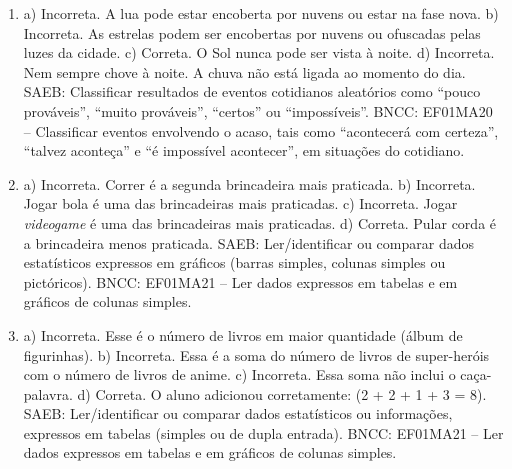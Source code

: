 \begin{enumerate}
\item
a) Incorreta. A lua pode estar encoberta por nuvens ou estar na fase nova.
b) Incorreta. As estrelas podem ser encobertas por nuvens ou ofuscadas pelas luzes da cidade.
c) Correta. O Sol nunca pode ser vista à noite.
d) Incorreta. Nem sempre chove à noite. A chuva não está ligada ao
momento do dia.
SAEB: Classificar resultados de eventos cotidianos aleatórios como
``pouco prováveis'', ``muito prováveis'', ``certos'' ou ``impossíveis''.
BNCC: EF01MA20 -- Classificar eventos envolvendo o acaso, tais como
``acontecerá com certeza'', ``talvez aconteça'' e ``é impossível
acontecer'', em situações do cotidiano.

\item
a) Incorreta. Correr é a segunda brincadeira mais praticada.
b) Incorreta. Jogar bola é uma das brincadeiras mais praticadas.
c) Incorreta. Jogar \textit{videogame} é uma das brincadeiras mais praticadas.
d) Correta. Pular corda é a brincadeira menos praticada.
SAEB: Ler/identificar ou comparar dados estatísticos expressos
em gráficos (barras simples, colunas simples ou pictóricos).
BNCC: EF01MA21 -- Ler dados expressos em tabelas e em gráficos de colunas
simples.

\item
a) Incorreta. Esse é o número de livros em maior quantidade (álbum de figurinhas).
b) Incorreta. Essa é a soma do número de livros de super-heróis com o número de livros de anime.
c) Incorreta. Essa soma não inclui o caça-palavra.
d) Correta. O aluno adicionou corretamente: (2 + 2 + 1 + 3 = 8).
SAEB: Ler/identificar ou comparar dados estatísticos ou
informações, expressos em tabelas (simples ou de dupla entrada).
BNCC: EF01MA21 -- Ler dados expressos em tabelas e em gráficos de colunas
simples.
\end{enumerate}


